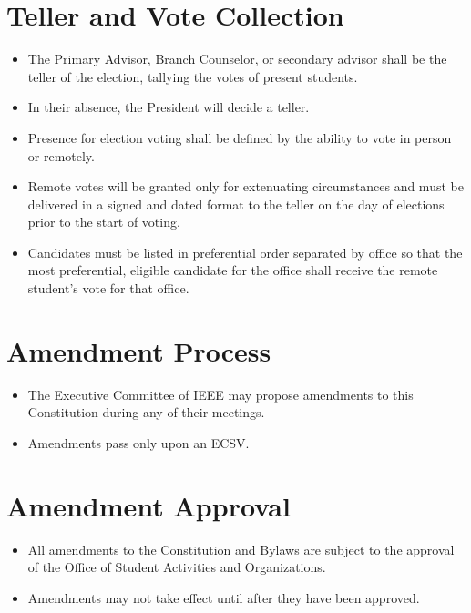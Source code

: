 \documentclass[12pt]{constitution}
\begin{document}
\section{Teller and Vote Collection}
\label{sec:elect_teller}
\begin{itemize}
    \item The Primary Advisor, Branch Counselor, or secondary advisor shall be the teller of the election, tallying the votes of present students.
    \item In their absence, the President will decide a teller.
    \item Presence for election voting shall be defined by the ability to vote in person or remotely.
    \item Remote votes will be granted only for extenuating circumstances and must be delivered in a signed and dated format to the teller on the day of elections prior to the start of voting.
    \item Candidates must be listed in preferential order separated by office so that the most preferential, eligible candidate for the office shall receive the remote student’s vote for that office.
\end{itemize}


\label{art:amend}

\section{Amendment Process}
\label{sec:amend_process}
\begin{itemize}
    \item The Executive Committee of IEEE may propose amendments to this Constitution during any of their meetings.
    \item Amendments pass only upon an ECSV.
\end{itemize}

\section{Amendment Approval}
\label{sec:amend_approve}
\begin{itemize}
    \item All amendments to the Constitution and Bylaws are subject to the approval of the Office of Student Activities and Organizations.
    \item Amendments may not take effect until after they have been approved.
\end{itemize}
\end{document}
